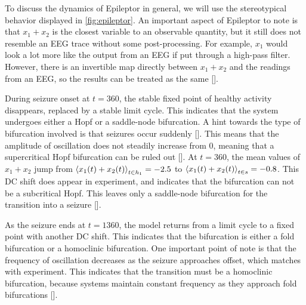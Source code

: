 To discuss the dynamics of Epileptor in general, we will use the stereotypical behavior displayed in \cref{fig:epileptor}.
An important aspect of Epileptor to note is that $x_{1} + x_{2}$ is the closest variable to an observable quantity, but it still does not resemble an EEG trace without some post-processing.
For example, $x_{1}$ would look a lot more like the output from an EEG if put through a high-pass filter.
However, there is an invertible map directly between $x_{1} + x_{2}$ and the readings from an EEG, so the results can be treated as the same [].

During seizure onset at $t = 360$, the stable fixed point of healthy activity disappears, replaced by a stable limit cycle.
This indicates that the system undergoes either a Hopf or a saddle-node bifurcation.
A hint towards the type of bifurcation involved is that seizures occur suddenly [].
This means that the amplitude of oscillation does not steadily increase from 0, meaning that a supercritical Hopf bifurcation can be ruled out [].
At $t = 360$, the mean values of $x_{1} + x_{2}$ jump from $\expval{x_{1}(t) + x_{2}(t)}_{t \in h_{1}} = -2.5$ to $\expval{x_{1}(t) + x_{2}(t)}_{t \in s} = -0.8$.
This DC shift does appear in experiment, and indicates that the bifurcation can not be a subcritical Hopf.
This leaves only a saddle-node bifurcation for the transition into a seizure [].

As the seizure ends at $t = 1360$, the model returns from a limit cycle to a fixed point with another DC shift.
This indicates that the bifurcation is either a fold bifurcation or a homoclinic bifurcation.
One important point of note is that the frequency of oscillation decreases as the seizure approaches offset, which matches with experiment.
This indicates that the transition must be a homoclinic bifurcation, because systems maintain constant frequency as they approach fold bifurcations [].

